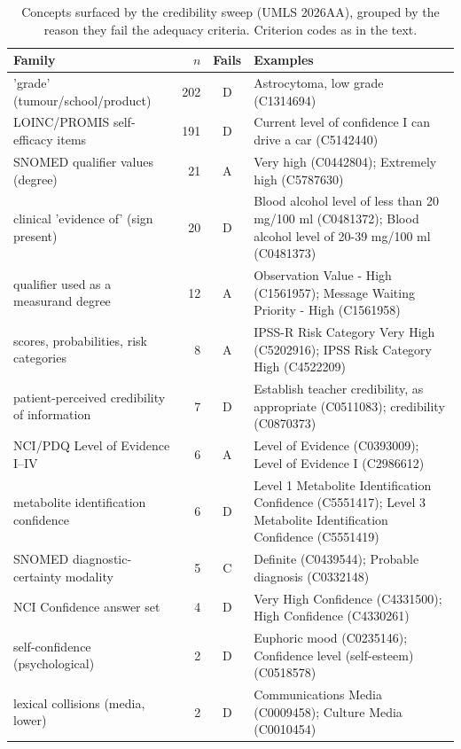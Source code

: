 \begin{table}[H]
  \centering
  \small
  \caption[Credibility sweep: rejected families]{Concepts surfaced by the
  credibility sweep (UMLS 2026AA), grouped by the reason they fail the
  adequacy criteria. Criterion codes as in the text.}
  \label{tab:cred-families}
  \begin{tabularx}{\linewidth}{@{}>{\raggedright\arraybackslash}X r c >{\raggedright\arraybackslash}X@{}}
    \toprule
    Family & $n$ & Fails & Examples \\
    \midrule
    'grade' (tumour/school/product) & 202 & D & Astrocytoma, low grade (C1314694) \\
    LOINC/PROMIS self-efficacy items & 191 & D & Current level of confidence I can drive a car (C5142440) \\
    SNOMED qualifier values (degree) & 21 & A & Very high (C0442804); Extremely high (C5787630) \\
    clinical 'evidence of' (sign present) & 20 & D & Blood alcohol level of less than 20 mg/100 ml (C0481372); Blood alcohol level of 20-39 mg/100 ml (C0481373) \\
    qualifier used as a measurand degree & 12 & A & Observation Value - High (C1561957); Message Waiting Priority - High (C1561958) \\
    scores, probabilities, risk categories & 8 & A & IPSS-R Risk Category Very High (C5202916); IPSS Risk Category High (C4522209) \\
    patient-perceived credibility of information & 7 & D & Establish teacher credibility, as appropriate (C0511083); credibility (C0870373) \\
    NCI/PDQ Level of Evidence I–IV & 6 & A & Level of Evidence (C0393009); Level of Evidence I (C2986612) \\
    metabolite identification confidence & 6 & D & Level 1 Metabolite Identification Confidence (C5551417); Level 3 Metabolite Identification Confidence (C5551419) \\
    SNOMED diagnostic-certainty modality & 5 & C & Definite (C0439544); Probable diagnosis (C0332148) \\
    NCI Confidence answer set & 4 & D & Very High Confidence (C4331500); High Confidence (C4330261) \\
    self-confidence (psychological) & 2 & D & Euphoric mood (C0235146); Confidence level (self-esteem) (C0518578) \\
    lexical collisions (media, lower) & 2 & D & Communications Media (C0009458); Culture Media (C0010454) \\

\end{tabularx}
\end{table}
